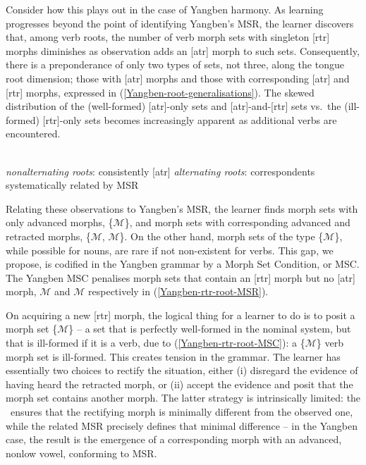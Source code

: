 Consider how this plays out in the case of Yangben harmony. As learning progresses beyond the point of identifying Yangben's MSR\down{\sc [tr]}, the learner  discovers  that, among verb roots, the number of verb morph sets with singleton [rtr] morphs diminishes as observation adds an [atr] morph to such sets. Consequently, there is a preponderance of only two types of sets, not three, along the tongue root dimension; those with [atr] morphs and those with corresponding [atr] and [rtr] morphs, expressed in (\ref{Yangben-root-generalisations}). The skewed distribution of the (well-formed) [atr]-only sets and [atr]-and-[rtr] sets vs.\ the (ill-formed) [rtr]-only sets becomes increasingly apparent as additional verbs are encountered.

\begin{example}  \\ \label{Yangben-root-generalisations}
\ea \textit{nonalternating roots}: consistently [atr]
\ex \textit{alternating roots}: correspondents systematically related by MSR\down{\sc [tr]}
\z
\end{example}

Relating these observations to Yangben's MSR\down{\sc [tr]}, the learner finds morph sets  with only advanced morphs,  \{$\mathcal{M}$\down{[atr]}\}, and morph sets with corresponding advanced and retracted morphs, \{$\mathcal{M}$\down{[atr]}, $\mathcal{M}$\down{[rtr]}\}. On the other hand, morph sets of the type \{$\mathcal{M}$\down{[rtr]}\}, while possible for nouns, are rare if not non-existent for verbs. This gap, we propose, is codified in the Yangben grammar by a Morph Set Condition, or MSC. The Yangben MSC\down{\sc [tr]} penalises morph sets that contain an [rtr] morph but no [atr] morph, $\mathcal{M}$ and $\mathcal{M}$ respectively in (\ref{Yangben-rtr-root-MSR}). 

On acquiring a new [rtr] morph, the logical thing for a learner to do is to posit a morph set \{$\mathcal{M}$\down{[rtr]}\} -- a set that is perfectly well-formed in the nominal system, but that is ill-formed if it is a verb, due to  (\ref{Yangben-rtr-root-MSC}): a \{$\mathcal{M}$\down{[rtr]}\}  verb morph set  is  ill-formed. This  creates tension in the grammar. The learner has essentially two choices to rectify the situation, either (i) disregard the evidence of having heard the retracted morph, or (ii) accept the evidence and posit that the morph set contains another morph. The latter strategy is intrinsically limited:  the \Identity\ ensures that the rectifying morph is minimally different from the observed one, while the related MSR precisely defines that minimal difference -- in the Yangben case, the result is the emergence of a corresponding morph with an advanced, nonlow vowel, conforming to MSR\down{\sc [tr]}.

